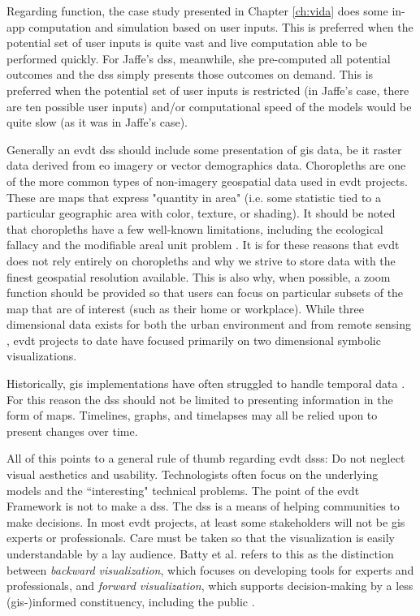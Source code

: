 Regarding function, the case study presented in Chapter \ref{ch:vida} does some in-app computation and simulation based on user inputs. This is preferred when the potential set of user inputs is quite vast and live computation able to be performed quickly. For Jaffe's \ac{dss}, meanwhile, she pre-computed all potential outcomes and the \ac{dss} simply presents those outcomes on demand. This is preferred when the potential set of user inputs is restricted (in Jaffe's case, there are ten possible user inputs) and/or computational speed of the models would be quite slow (as it was in Jaffe's case). 

Generally an \ac{evdt} \ac{dss} should include some presentation of \ac{gis} data, be it raster data derived from \ac{eo} imagery or vector demographics data. Choropleths are one of the more common types of non-imagery geospatial data used in \ac{evdt} projects. These are maps that express "quantity in area" (i.e. some statistic tied to a particular geographic area with color, texture, or shading). It should be noted that choropleths have a few well-known limitations, including the ecological fallacy and the modifiable areal unit problem \cite{cramptonRethinkingMapsIdentity2011, sawickiNeighborhoodIndicatorsReview1996}. It is for these reasons that \ac{evdt} does not rely entirely on choropleths and why we strive to store data with the finest geospatial resolution available. This is also why, when possible, a zoom function should be provided so that users can focus on particular subsets of the map that are of interest (such as their home or workplace). While three dimensional data exists for both the urban environment \cite{battyVisualizingCityCommunication2000} and from remote sensing \cite{sunAerial3DBuilding2013}, \ac{evdt} projects to date have focused primarily on two dimensional symbolic visualizations.

Historically, \ac{gis} implementations have often struggled to handle temporal data \cite{harrisLocationalModelsGeographic1993}. For this reason the \ac{dss} should not be limited to presenting information in the form of maps. Timelines, graphs, and timelapses may all be relied upon to present changes over time.

All of this points to a general rule of thumb regarding \ac{evdt} \acp{dss}: Do not neglect visual aesthetics and usability. Technologists often focus on the underlying models and the ``interesting" technical problems. The point of the \ac{evdt} Framework is not to make a \ac{dss}. The \ac{dss} is a means of helping communities to make decisions. In most \ac{evdt} projects, at least some stakeholders will not be \ac{gis} experts or professionals. Care must be taken so that the visualization is easily understandable by a lay audience. Batty et al. refers to this as the distinction between \textit{backward visualization}, which focuses on developing tools for experts and professionals, and \textit{forward visualization}, which supports decision-making by a less (\ac{gis}-)informed constituency, including the public \cite{battyVisualizingCityCommunication2000}.

